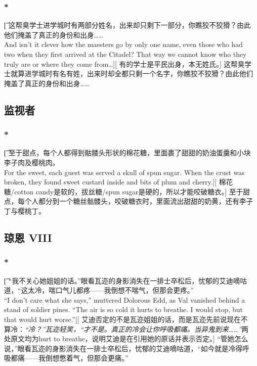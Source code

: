 \documentclass[12pt,a4paper]{article}
\begin{document}
\subsubsection{\color{red}*}\t[
	这帮臭学士进学城时有两部分姓名，出来却只剩下一部分，你瞧狡不狡猾？由此他们掩盖了真正的身份和出身……\\
	And isn't it clever how the maesters go by only one name, even those who had two when they first arrived at the Citadel? That way we cannot know who they truly are or where they come from\ldots ][
	有的学士是平民出身，本无姓氏。]
	这帮臭学士就算进学城时有名有姓，出来时却全都只剩一个名字，你瞧狡不狡猾？由此他们掩盖了真正的身份和出身……
	
\subsection{监视者}
\subsubsection{\color{red}*}\t[	
	至于甜点，每个人都得到骷髅头形状的棉花糖，里面裹了甜甜的奶油蛋羹和小块李子肉及樱桃肉。\\
	For the sweet, each guest was served a skull of spun sugar. When the crust was broken, they found sweet custard inside and bits of plum and cherry.][
	棉花糖/cotton candy是软的，拔丝糖/spun sugar是硬的，所以才能咬破糖衣。]
	至于甜点，每个人都分到一个糖丝骷髅头，咬破糖衣时，里面流出甜甜的奶黄，还有李子丁与樱桃丁。
	
\subsection{琼恩 VIII}
\subsubsection{\color{red}*}\t[
	“我不关心她姐姐的话。”眼看瓦迩的身影消失在一排士卒松后，忧郁的艾迪嘀咕道，“这太冷，喘口气儿都疼——我倒想不喘气，但那会更疼。”\\
	“I don't care what she says,” muttered Dolorous Edd, as Val vanished behind a stand of soldier pines. “The air is so cold it hurts to breathe. I would stop, but that would hurt worse.”][
	艾迪否定的不是瓦迩姐姐的话，而是瓦迩先前说现在不算冷：\emph{“冷？”瓦迩轻笑，“才不是。真正的冷会让你呼吸都痛。当异鬼到来……”}两处原文均为hurt to breathe，说明艾迪是在引用她的原话并表示否定。]
	“管她怎么说，”眼看瓦迩的身影消失在一排士卒松后，忧郁的艾迪嘀咕道，“如今就是冷得呼吸都痛——我倒想憋着气，但那会更痛。”
	
\end{document}
